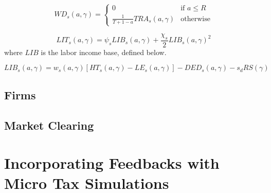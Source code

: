 \documentclass[letterpaper,12pt]{article}
\theoremstyle{definition}
\numberwithin{equation}{section}
\begin{document}
\begin{spacing}{1.5}
  \begin{equation}
  WD_s(a,\gamma) = \left\{ \begin{matrix} 0 & \text{if }a\le R \\ \frac{1}{T+1-a} TRA_s(a,\gamma)& \text{otherwise} \end{matrix}\right.
  \end{equation}

  \begin{equation}
  LIT_s(a,\gamma) = \psi_sLIB_s(a,\gamma) + \frac{\chi_s}{2} LIB_s(a,\gamma)^2
  \end{equation}
  where $LIB$ is the labor income base, defined below.

  \begin{equation}
  LIB_s(a,\gamma) = w_s(a,\gamma) [HT_s(a,\gamma) - LE_s(a,\gamma)] - DED_s(a,\gamma) - s_d RS(\gamma)
  \end{equation}

  \subsection{Firms}

  \subsection{Market Clearing}

\section{Incorporating Feedbacks with Micro Tax Simulations}\label{SecMicro}


\end{spacing}
\end{document}
